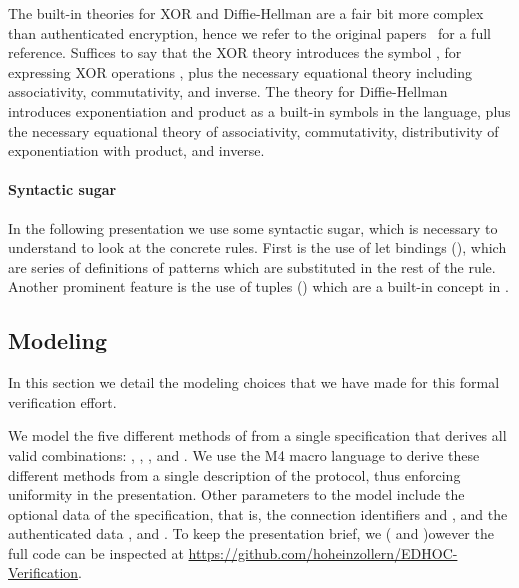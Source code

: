The built-in theories for XOR and Diffie-Hellman are a fair bit more complex
than authenticated encryption, hence we refer to the original
papers~\cite{xorTamarin,dhTamarin}  for a full reference. 
%
Suffices to say that the XOR theory introduces the symbol , for
expressing XOR operations , plus the necessary equational theory
including associativity, commutativity, and inverse.
%
The theory for Diffie-Hellman introduces exponentiation  and product
 as a built-in symbols in the language, plus the necessary equational
theory of associativity, commutativity, distributivity of exponentiation with
product, and inverse.


\paragraph{Syntactic sugar} In the following presentation we use some syntactic
sugar, which is necessary to understand to look at the concrete rules. First is
the use of let bindings (), which are series of
definitions of patterns which are substituted in the rest of the rule. Another
prominent feature is the use of tuples () which are a
built-in concept in \mTamarin.

\subsection{Modeling \mEdhoc{}}
In this section we detail the modeling choices that we have made for this formal
verification effort.

We model the five different methods of \mEdhoc{} from a single specification
that derives all valid combinations: \mPskPsk, \mSigSig, \mSigStat, \mStatSig{}
and \mStatStat.
%
We use the M4 macro language to derive these different methods from a single
description of the protocol, thus enforcing uniformity in the presentation.
%
Other parameters to the model include the optional data of the \mEdhoc{}
specification, that is, the connection identifiers \mCi{} and \mCr{}, and
the authenticated data \mADone, \mADtwo{} and \mADthree.
%
To keep the presentation brief, we  (\mSigStat{} and \mStatSig)owever the full
code can be inspected at
\url{https://github.com/hoheinzollern/EDHOC-Verification}.

